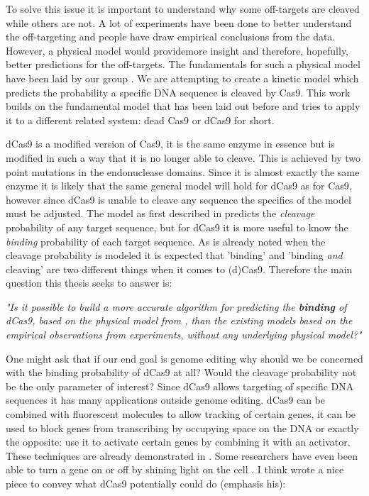 To solve this issue it is important to understand why some off-targets are cleaved while others are not. A lot of experiments have been done to better understand the off-targeting and people have draw empirical conclusions from the data. However, a physical model would providemore insight and therefore, hopefully, better predictions for the off-targets. The fundamentals for such a physical model have been laid by our group \citep{Misha}. We are attempting to create a kinetic model which predicts the probability a specific DNA sequence is cleaved by Cas9. This work builds on the fundamental model that has been laid out before and tries to apply it to a different related system: dead Cas9 or dCas9 for short.

dCas9 is a modified version of Cas9, it is the same enzyme in essence but is modified in such a way that it is no longer able to cleave. This is achieved by two point mutations in the endonuclease domains. Since it is almost exactly the same enzyme it is likely that the same general model will hold for dCas9 as for Cas9, however since dCas9 is unable to cleave any sequence the specifics of the model must be adjusted. The model as first described in \cite{Misha} predicts the \emph{cleavage} probability of any target sequence, but for dCas9 it is more useful to know the \emph{binding} probability of each target sequence. As is already noted when the cleavage probability is modeled it is expected that 'binding' and 'binding \emph{and} cleaving' are two different things when it comes to (d)Cas9. Therefore the main question this thesis seeks to answer is:

\begin{center}
\emph{"Is it possible to build a more accurate algorithm for predicting the \textbf{binding} of dCas9, based on the physical model from \cite{Misha}, than the existing models based on the empirical observations from experiments, without any underlying physical model?"}
\end{center}

One might ask that if our end goal is genome editing why should we be concerned with the binding probability of dCas9 at all? Would the cleavage probability not be the only parameter of interest? Since dCas9 allows targeting of specific DNA sequences it has many applications outside genome editing. dCas9 can be combined with fluorescent molecules to allow tracking of certain genes, it can be used to block genes from transcribing by occupying space on the DNA or exactly the opposite: use it to activate certain genes by combining it with an activator. These techniques are already demonstrated in \cite{gilbert2014genome}. Some researchers have even been able to turn a gene on or off by shining light on the cell \citep{polstein2015light}. I think \cite{theatlantic} wrote a nice piece to convey what dCas9 potentially could do (emphasis his):

